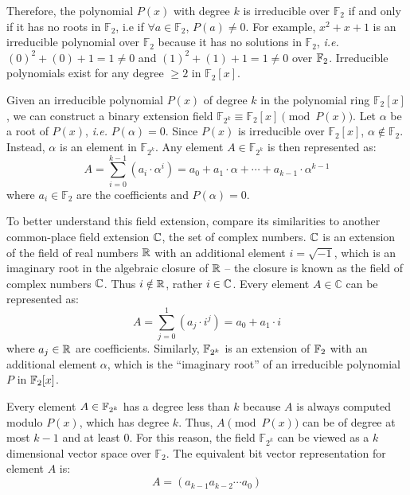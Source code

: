 Therefore, the polynomial $P(x)$ with degree $k$ is irreducible over 
$\mathbb{F}_{2}$ if and only if it has no roots in $\mathbb{F}_{2}$,
i.e if $\forall a \in \mathbb{F}_{2}$, $P(a)\neq 0$.
For example, $x^2+x+1$ is an irreducible polynomial over $\mathbb{F}_{2}$
because it has no solutions in $\mathbb{F}_{2}$, {\it i.e.} $(0)^2+(0)+1=1\neq0$ 
and $(1)^2+(1)+1=1\neq0$ over ${\mathbb{F}}_2$.
Irreducible polynomials exist for any degree $\geq 2$ in $\mathbb{F}_2[x]$.

Given an irreducible polynomial $P(x)$ of degree $k$ in the polynomial ring 
$\mathbb{F}_2[x]$, we can construct a binary extension field 
$\mathbb{F}_{2^k} \equiv \mathbb{F}_2[x] \pmod{P(x)}$.
Let $\alpha$ be a root of $P(x)$, {\it i.e.} $P(\alpha)=0$.
Since $P(x)$ is irreducible over
$\mathbb{F}_2[x]$, $\alpha \notin \mathbb{F}_2$. 
Instead, $\alpha$ is an element in $\mathbb{F}_{2^k}$. 
Any element $A \in \mathbb{F}_{2^k}$ is then represented as: 
\begin{equation}\label{rep:poly}
A= \sum_{i=0}^{k-1} (a_i \cdot \alpha^i) = a_0 + a_1\cdot\alpha + \cdots + a_{k-1}\cdot \alpha^{k-1}\nonumber
\end{equation}
where $a_i \in \mathbb{F}_2$ are the coefficients and $P(\alpha)=0$.

To better understand this field extension, compare its similarities to another
common-place
field extension ${\mathbb{C}}$, the set of complex numbers. ${\mathbb{C}}$ is an extension of the field 
of real numbers ${\mathbb{R}}$ with an additional element $i=\sqrt{-1}$, which is an imaginary
root in the algebraic closure of ${\mathbb{R}}$ -- the closure is known as the field of complex numbers ${\mathbb{C}}$.
Thus $i \notin {\mathbb{R}}$, rather $i \in {\mathbb{C}}$.
Every element $A \in \mathbb{C}$ can be represented as:
\begin{equation}\label{rep:polyC}
A=\sum_{j=0}^{1} (a_j \cdot i^j)=a_0+a_1\cdot i
\end{equation}
where $a_j \in {\mathbb{R}}$ are coefficients. Similarly, ${\mathbb{F}}_{2^k}$ is an extension of ${\mathbb{F}}_2$ with 
an additional element $\alpha$, which is the ``imaginary root'' of an irreducible 
polynomial $P$ in ${\mathbb{F}}_2[x]$.

Every element $A \in {\mathbb{F}}_{2^k}$ has a degree less than $k$ because 
$A$ is always computed modulo $P(x)$, which has degree $k$. 
Thus, $A\pmod {P(x)}$ can be of degree at most $k-1$ and at least $0$.
For this reason, the field $\mathbb{F}_{2^k}$ can be viewed as a $k$
dimensional vector space over $\mathbb{F}_{2}$. 
The equivalent bit vector representation for element $A$ is:
\begin{equation}
A=(a_{k-1} a_{k-2} \cdots a_{0})
\end{equation}

